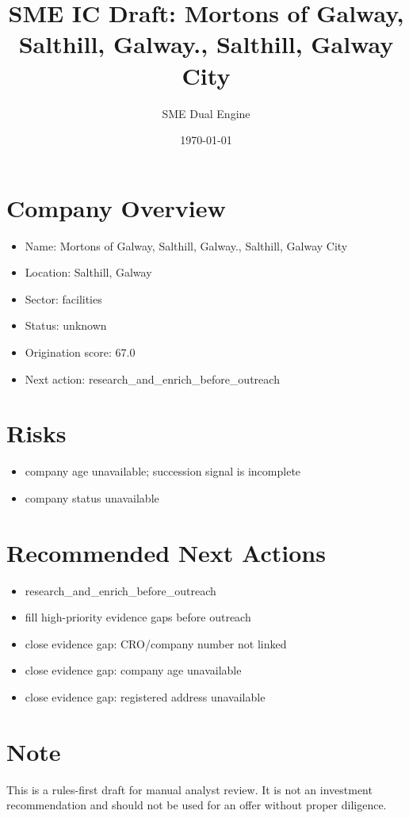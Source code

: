 \documentclass[11pt,a4paper]{article}
\title{SME IC Draft: Mortons of Galway, Salthill, Galway., Salthill, Galway City}
\author{SME Dual Engine}
\date{\today}
\begin{document}
\maketitle
\section*{Company Overview}
\begin{itemize}[leftmargin=1.4em]
\item Name: Mortons of Galway, Salthill, Galway., Salthill, Galway City
\item Location: Salthill, Galway
\item Sector: facilities
\item Status: unknown
\item Origination score: 67.0
\item Next action: research\_and\_enrich\_before\_outreach
\end{itemize}
\section*{Risks}
\begin{itemize}[leftmargin=1.4em]
\item company age unavailable; succession signal is incomplete
\item company status unavailable
\end{itemize}
\section*{Recommended Next Actions}
\begin{itemize}[leftmargin=1.4em]
\item research\_and\_enrich\_before\_outreach
\item fill high-priority evidence gaps before outreach
\item close evidence gap: CRO/company number not linked
\item close evidence gap: company age unavailable
\item close evidence gap: registered address unavailable
\end{itemize}
\section*{Note}
This is a rules-first draft for manual analyst review. It is not an investment
recommendation and should not be used for an offer without proper diligence.
\end{document}
